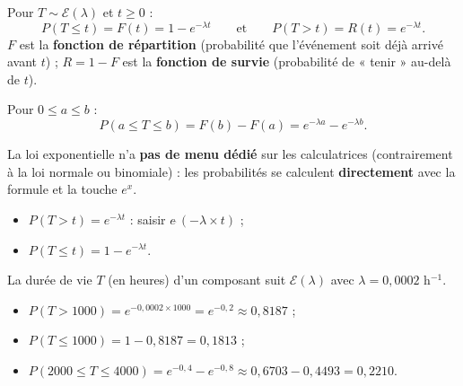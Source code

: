 \documentclass[a4paper,11pt]{article}
\begin{document}
\begin{theoreme}
Pour $T \sim \mathcal{E}(\lambda)$ et $t \geq 0$ :
\[
\boxed{P(T \leq t) = F(t) = 1 - e^{-\lambda t}} \qquad\text{et}\qquad \boxed{P(T > t) = R(t) = e^{-\lambda t}}.
\]
$F$ est la \textbf{fonction de répartition} (probabilité que l'événement soit déjà arrivé avant $t$) ; $R = 1 - F$ est la \textbf{fonction de survie} (probabilité de « tenir » au-delà de $t$).
\end{theoreme}

\begin{center}
\end{center}

\begin{theoreme}
Pour $0 \leq a \leq b$ :
\[
P(a \leq T \leq b) = F(b) - F(a) = e^{-\lambda a} - e^{-\lambda b}.
\]
\end{theoreme}

\begin{calculatrice}
La loi exponentielle n'a \textbf{pas de menu dédié} sur les calculatrices (contrairement à la loi normale ou binomiale) : les probabilités se calculent \textbf{directement} avec la formule et la touche \texttt{$e^x$}.
\begin{itemize}
  \item $P(T > t) = e^{-\lambda t}$ : saisir \texttt{$e\hat{\ }(-\lambda \times t)$} ;
  \item $P(T \leq t) = 1 - e^{-\lambda t}$.
\end{itemize}
\end{calculatrice}

\begin{exemple}
La durée de vie $T$ (en heures) d'un composant suit $\mathcal{E}(\lambda)$ avec $\lambda = 0{,}0002$ h$^{-1}$.
\begin{itemize}
  \item $P(T > 1000) = e^{-0{,}0002 \times 1000} = e^{-0{,}2} \approx 0{,}8187$ ;
  \item $P(T \leq 1000) = 1 - 0{,}8187 = 0{,}1813$ ;
  \item $P(2000 \leq T \leq 4000) = e^{-0{,}4} - e^{-0{,}8} \approx 0{,}6703 - 0{,}4493 = 0{,}2210$.
\end{itemize}
\end{exemple}
\end{document}
